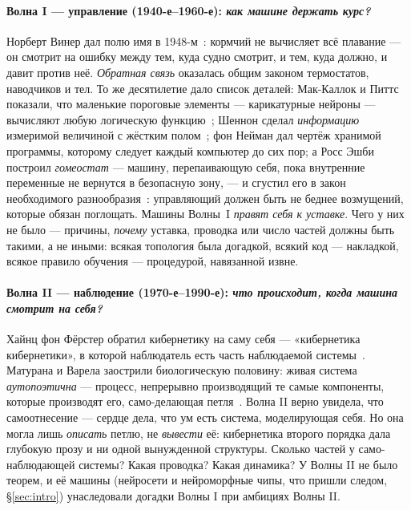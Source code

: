 \paragraph{Волна I --- управление (1940-е--1960-е): \emph{как машине держать
курс?}} Норберт Винер дал полю имя в 1948-м~\cite{wiener1948}: кормчий не
вычисляет всё плавание --- он смотрит на ошибку между тем, куда судно
смотрит, и тем, куда должно, и давит против неё. \emph{Обратная связь}
оказалась общим законом термостатов, наводчиков и тел. То же десятилетие дало
список деталей: Мак-Каллок и Питтс показали, что маленькие пороговые
элементы --- карикатурные нейроны --- вычисляют любую логическую
функцию~\cite{mcculloch1943}; Шеннон сделал \emph{информацию} измеримой
величиной с жёстким полом~\cite{shannon1948}; фон Нейман дал чертёж хранимой
программы, которому следует каждый компьютер до сих пор; а Росс Эшби построил
\emph{гомеостат} --- машину, перепаивающую себя, пока внутренние переменные
не вернутся в безопасную зону, --- и сгустил его в закон необходимого
разнообразия~\cite{ashby1956}: управляющий должен быть не беднее возмущений,
которые обязан поглощать. Машины Волны~I \emph{правят себя к уставке}. Чего у
них не было --- причины, \emph{почему} уставка, проводка или число частей
должны быть такими, а не иными: всякая топология была догадкой, всякий код
--- накладкой, всякое правило обучения --- процедурой, навязанной извне.

\paragraph{Волна II --- наблюдение (1970-е--1990-е): \emph{что происходит,
когда машина смотрит на себя?}} Хайнц фон Фёрстер обратил кибернетику на
саму себя --- «кибернетика кибернетики», в которой наблюдатель есть часть
наблюдаемой системы~\cite{foerster2003}. Матурана и Варела заострили
биологическую половину: живая система \emph{аутопоэтична} --- процесс,
непрерывно производящий те самые компоненты, которые производят его,
само-делающая петля~\cite{maturana1980}. Волна II верно увидела, что
самоотнесение --- сердце дела, что ум есть система, моделирующая себя. Но она
могла лишь \emph{описать} петлю, не \emph{вывести} её: кибернетика второго
порядка дала глубокую прозу и ни одной вынужденной структуры. Сколько частей
у само-наблюдающей системы? Какая проводка? Какая динамика? У Волны II не
было теорем, и её машины (нейросети и нейроморфные чипы, что пришли следом,
\S\ref{sec:intro}) унаследовали догадки Волны I при амбициях Волны II.


